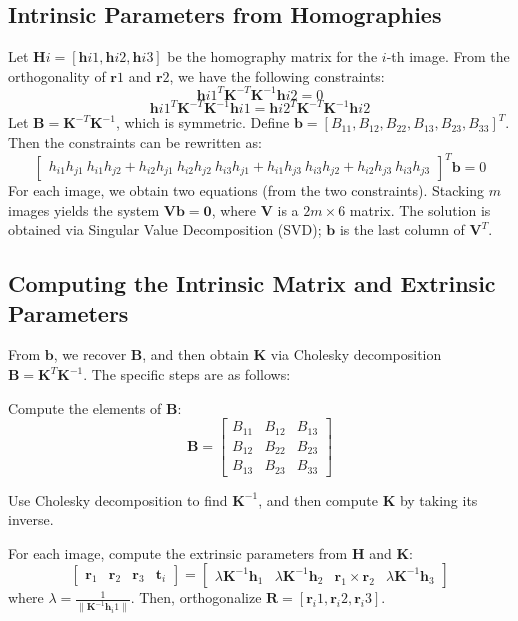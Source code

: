 \documentclass{article}
\begin{document}
\subsection{Intrinsic Parameters from Homographies}
Let $\mathbf{H}i = [\mathbf{h}{i1}, \mathbf{h}{i2}, \mathbf{h}{i3}]$ be the homography matrix for the $i$-th image. From the orthogonality of $\mathbf{r}1$ and $\mathbf{r}2$, we have the following constraints:
\[
\mathbf{h}{i1}^T \mathbf{K}^{-T} \mathbf{K}^{-1} \mathbf{h}{i2} = 0
\]
\[
\mathbf{h}{i1}^T \mathbf{K}^{-T} \mathbf{K}^{-1} \mathbf{h}{i1} = \mathbf{h}{i2}^T \mathbf{K}^{-T} \mathbf{K}^{-1} \mathbf{h}{i2}
\]
Let $\mathbf{B} = \mathbf{K}^{-T} \mathbf{K}^{-1}$, which is symmetric. Define $\mathbf{b} = [B_{11}, B_{12}, B_{22}, B_{13}, B_{23}, B_{33}]^T$. Then the constraints can be rewritten as:
\[
\begin{bmatrix}
h_{i1} h_{j1} \
h_{i1} h_{j2} + h_{i2} h_{j1} \
h_{i2} h_{j2} \
h_{i3} h_{j1} + h_{i1} h_{j3} \
h_{i3} h_{j2} + h_{i2} h_{j3} \
h_{i3} h_{j3}
\end{bmatrix}^T \mathbf{b} = 0
\]
For each image, we obtain two equations (from the two constraints). Stacking $m$ images yields the system $\mathbf{V} \mathbf{b} = \mathbf{0}$, where $\mathbf{V}$ is a $2m \times 6$ matrix. The solution is obtained via Singular Value Decomposition (SVD); $\mathbf{b}$ is the last column of $\mathbf{V}^T$.

\subsection{Computing the Intrinsic Matrix and Extrinsic Parameters}
From $\mathbf{b}$, we recover $\mathbf{B}$, and then obtain $\mathbf{K}$ via Cholesky decomposition $\mathbf{B} = \mathbf{K}^T \mathbf{K}^{-1}$. The specific steps are as follows:

Compute the elements of $\mathbf{B}$:
\[
\mathbf{B} = \begin{bmatrix}
B_{11} & B_{12} & B_{13} \\
B_{12} & B_{22} & B_{23} \\
B_{13} & B_{23} & B_{33}
\end{bmatrix}
\]

Use Cholesky decomposition to find $\mathbf{K}^{-1}$, and then compute $\mathbf{K}$ by taking its inverse.

For each image, compute the extrinsic parameters from $\mathbf{H}$ and $\mathbf{K}$:
\[
\begin{bmatrix}
\mathbf{r}_1 & \mathbf{r}_2 & \mathbf{r}_3 & \mathbf{t}_i
\end{bmatrix}
=
\begin{bmatrix}
\lambda \mathbf{K}^{-1} \mathbf{h}_1 & \lambda \mathbf{K}^{-1} \mathbf{h}_2 & \mathbf{r}_1 \times \mathbf{r}_2 & \lambda \mathbf{K}^{-1} \mathbf{h}_3
\end{bmatrix}
\]
where $\lambda = \frac{1}{\|\mathbf{K}^{-1} \mathbf{h}_i1\|}$. Then, orthogonalize $\mathbf{R} = [\mathbf{r}_i1, \mathbf{r}_i2, \mathbf{r}_i3]$.
\end{document}
